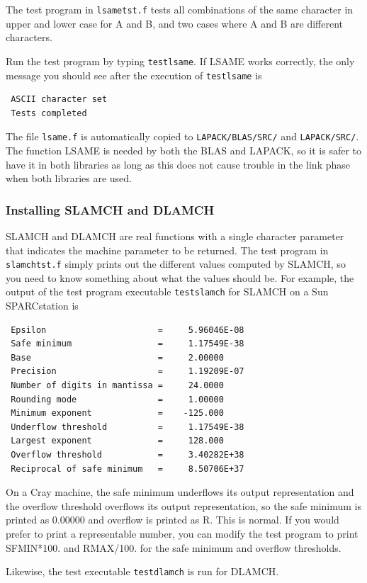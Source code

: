 \documentclass[11pt]{report}
\begin{document}
The test program in \texttt{lsametst.f} tests all combinations of
the same character in upper and lower case for A and B, and two
cases where A and B are different characters.

Run the test program by typing \texttt{testlsame}.
If LSAME works correctly, the only message you should see after the
execution of \texttt{testlsame} is
\begin{verbatim}
 ASCII character set
 Tests completed
\end{verbatim}
The file \texttt{lsame.f} is automatically copied to
\texttt{LAPACK/BLAS/SRC/} and \texttt{LAPACK/SRC/}.
The function LSAME is needed by both the BLAS and LAPACK, so it is safer
to have it in both libraries as long as this does not cause trouble
in the link phase when both libraries are used.

\subsubsection{Installing SLAMCH and DLAMCH}

SLAMCH and DLAMCH are real functions with a single character parameter
that indicates the machine parameter to be returned.  The test
program in \texttt{slamchtst.f}
simply prints out the different values computed by SLAMCH,
so you need to know something about what the values should be.
For example, the output of the test program executable \texttt{testslamch}
for SLAMCH on a Sun SPARCstation is
\begin{verbatim}
 Epsilon                      =     5.96046E-08
 Safe minimum                 =     1.17549E-38
 Base                         =     2.00000
 Precision                    =     1.19209E-07
 Number of digits in mantissa =     24.0000
 Rounding mode                =     1.00000
 Minimum exponent             =    -125.000
 Underflow threshold          =     1.17549E-38
 Largest exponent             =     128.000
 Overflow threshold           =     3.40282E+38
 Reciprocal of safe minimum   =     8.50706E+37
\end{verbatim}
On a Cray machine, the safe minimum underflows its output
representation and the overflow threshold overflows its output
representation, so the safe minimum is printed as 0.00000 and overflow
is printed as R.  This is normal.
If you would prefer to print a representable number, you can modify
the test program to print SFMIN*100. and RMAX/100. for the safe
minimum and overflow thresholds.

Likewise, the test executable \texttt{testdlamch} is run for DLAMCH.
\end{document}
